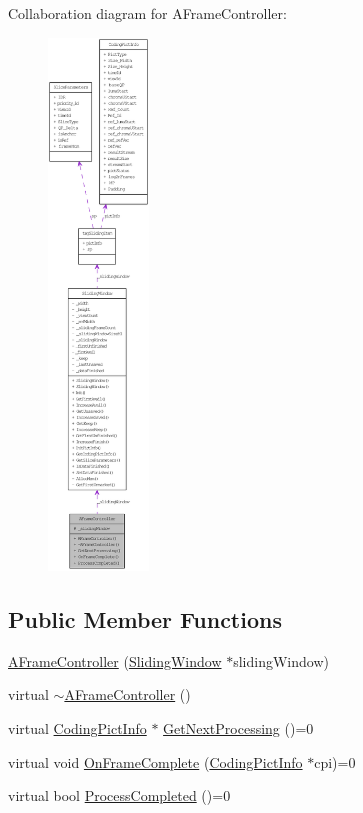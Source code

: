 Collaboration diagram for AFrameController:\nopagebreak
\begin{figure}[H]
\begin{center}
\leavevmode
\includegraphics[height=400pt]{class_a_frame_controller__coll__graph}
\end{center}
\end{figure}
\subsection*{Public Member Functions}
\begin{DoxyCompactItemize}
\item 
\hyperlink{class_a_frame_controller_a448319ad03f91eebc5da7fdf8a43516c}{AFrameController} (\hyperlink{class_sliding_window}{SlidingWindow} $\ast$slidingWindow)
\item 
virtual \hyperlink{class_a_frame_controller_a71b793347efaa6e35b494ae728739ad0}{$\sim$AFrameController} ()
\item 
virtual \hyperlink{struct_coding_pict_info}{CodingPictInfo} $\ast$ \hyperlink{class_a_frame_controller_acc142fa10ce535ee171698af719c4d27}{GetNextProcessing} ()=0
\item 
virtual void \hyperlink{class_a_frame_controller_afd4834463eebfc33536fed009bfb966c}{OnFrameComplete} (\hyperlink{struct_coding_pict_info}{CodingPictInfo} $\ast$cpi)=0
\item 
virtual bool \hyperlink{class_a_frame_controller_a92ba4b7f8c0c84fff8be7203fae5221d}{ProcessCompleted} ()=0
\end{DoxyCompactItemize}
